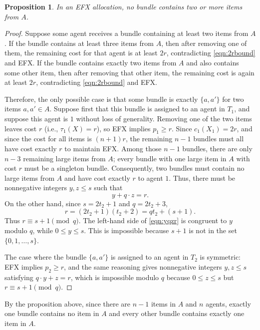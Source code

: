 \documentclass{article}
\newtheorem{proposition}{Proposition}
\theoremstyle{definition}
\begin{document}
\begin{proposition}
    In an EFX allocation, no bundle contains two or more items from $A$.
\end{proposition}
\begin{proof}
Suppose some agent receives a bundle containing at least two items from $A$. 
If the bundle contains at least three items from $A$, then after removing one of them, the remaining cost for that agent is at least $2r$, contradicting \eqref{eqn:2rbound} and EFX. 
If the bundle contains exactly two items from $A$ and also contains some other item, then after removing that other item, the remaining cost is again at least $2r$, contradicting \eqref{eqn:2rbound} and EFX.

Therefore, the only possible case is that some bundle is exactly $\{a,a'\}$ for two items $a,a'\in A$. 
Suppose first that this bundle is assigned to an agent in $T_1$, and suppose this agent is $1$ without loss of generality.
Removing one of the two items leaves cost $r$ (i.e., $\tau_1(X)=r$), so EFX implies $p_1\ge r$. 
Since $c_1(X_1)=2r$, and since the cost for all items is $(n+1)r$, the remaining $n-1$ bundles must all have cost exactly $r$ to maintain EFX. 
Among those $n-1$ bundles, there are only $n-3$ remaining large items from $A$; every bundle with one large item in $A$ with cost $r$ must be a singleton bundle. 
Consequently, two bundles must contain no large items from $A$ and have cost exactly $r$ to agent $1$. 
Thus, there must be nonnegative integers $y,z\le s$ such that
\begin{equation}\label{eqn:yqzr}
    y+q\cdot z=r.
\end{equation}
On the other hand, since $s=2t_2+1$ and $q=2t_2+3$,
\[
    r=(2t_2+1)(t_2+2)=qt_2+(s+1).
\]
Thus $r\equiv s+1\pmod q$. The left-hand side of \eqref{eqn:yqzr} is congruent to $y$ modulo $q$, while $0\le y\le s$. This is impossible because $s+1$ is not in the set $\{0,1,\ldots,s\}$.

The case where the bundle $\{a,a'\}$ is assigned to an agent in $T_2$ is symmetric: EFX implies $p_2\geq r$, and the same reasoning gives nonnegative integers $y,z\le s$ satisfying $q\cdot y+z=r$, which is impossible modulo $q$ because $0\le z\le s$ but $r\equiv s+1\pmod q$.
\end{proof}


By the proposition above, since there are $n-1$ items in $A$ and $n$ agents, exactly one bundle contains no item in $A$ and every other bundle contains exactly one item in $A$.
\end{document}
